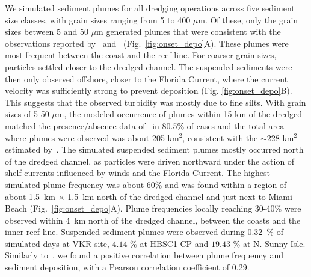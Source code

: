 \documentclass[preprint,12pt,authoryear]{elsarticle}
\begin{document}
We simulated sediment plumes for all dredging operations across five sediment size classes, with grain sizes ranging from 5 to 400 $\mu$m. Of these, only the grain sizes between 5 and 50 $\mu$m generated plumes that were consistent with the observations reported by~\cite{barnes2015sediment} and~\cite{cunning2019extensive} (Fig.~\ref{fig:onset_depo}A). These plumes were most frequent between the coast and the reef line. For coarser grain sizes, particles settled closer to the dredged channel. The suspended sediments were then only observed offshore, closer to the Florida Current, where the current velocity was sufficiently strong to prevent deposition (Fig. \ref{fig:onset_depo}B). This suggests that the observed turbidity was mostly due to fine silts. With grain sizes of 5-50 $\mu$m, the modeled occurrence of plumes  within 15 km of the dredged matched the presence/absence data of~\cite{cunning2019extensive} in 80.5\% of cases and the total area where plumes were observed was about 205 km$^2$, consistent with the $\sim$228 km$^2$ estimated by~\cite{barnes2015sediment}. The simulated suspended sediment plumes mostly occurred north of the dredged channel, as particles were driven northward under the action of shelf currents influenced by winds and the Florida Current. The highest simulated plume frequency was about 60\% and was found within a region of about 1.5~km $\times$ 1.5~km north of the dredged channel and just next to Miami Beach (Fig.~\ref{fig:onset_depo}A). Plume frequencies locally reaching 30-40\% were observed within 4~km north of the dredged channel, between the coasts and the inner reef line. Suspended sediment plumes were observed during $0.32$~\% of simulated days at VKR site, $4.14$ \% at HBSC1-CP and $19.43$ \% at N. Sunny Isle. Similarly to~\cite{cunning2019extensive}, we found a positive correlation between plume frequency and sediment deposition, with a Pearson correlation coefficient of 0.29.

\end{document}

